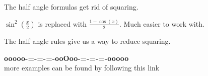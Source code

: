 \documentclass{ximera}
\begin{document}
The half angle formulas get rid of squaring.


$\sin^2\left( \tfrac{x}{2} \right)$ is replaced with $\frac{1 - \cos(x)}{2}$.  Much easier to work with.




The half angle rules give us a way to reduce squaring.









\begin{onlineOnly}
\begin{center}
\textbf{\textcolor{green!50!black}{ooooo-=-=-=-ooOoo-=-=-=-ooooo}} \\

more examples can be found by following this link\\ 

\end{center}
\end{onlineOnly}
\end{document}
